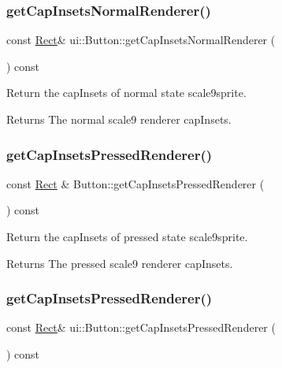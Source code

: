\subsubsection{\texorpdfstring{get\+Cap\+Insets\+Normal\+Renderer()}{getCapInsetsNormalRenderer()}\hspace{0.1cm}{\footnotesize\ttfamily [2/2]}}
{\footnotesize\ttfamily const \hyperlink{classRect}{Rect}\& ui\+::\+Button\+::get\+Cap\+Insets\+Normal\+Renderer (\begin{DoxyParamCaption}{ }\end{DoxyParamCaption}) const}

Return the cap\+Insets of normal state scale9sprite. \begin{DoxyReturn}{Returns}
The normal scale9 renderer cap\+Insets. 
\end{DoxyReturn}
\mbox{\label{classui_1_1Button_af89672f9e48eea3dd6389a1636ab2b08}} 
\subsubsection{\texorpdfstring{get\+Cap\+Insets\+Pressed\+Renderer()}{getCapInsetsPressedRenderer()}\hspace{0.1cm}{\footnotesize\ttfamily [1/2]}}
{\footnotesize\ttfamily const \hyperlink{classRect}{Rect} \& Button\+::get\+Cap\+Insets\+Pressed\+Renderer (\begin{DoxyParamCaption}{ }\end{DoxyParamCaption}) const}

Return the cap\+Insets of pressed state scale9sprite. \begin{DoxyReturn}{Returns}
The pressed scale9 renderer cap\+Insets. 
\end{DoxyReturn}
\mbox{\label{classui_1_1Button_a4b560554c520e4fcbef09274532686c7}} 
\subsubsection{\texorpdfstring{get\+Cap\+Insets\+Pressed\+Renderer()}{getCapInsetsPressedRenderer()}\hspace{0.1cm}{\footnotesize\ttfamily [2/2]}}
{\footnotesize\ttfamily const \hyperlink{classRect}{Rect}\& ui\+::\+Button\+::get\+Cap\+Insets\+Pressed\+Renderer (\begin{DoxyParamCaption}{ }\end{DoxyParamCaption}) const}

